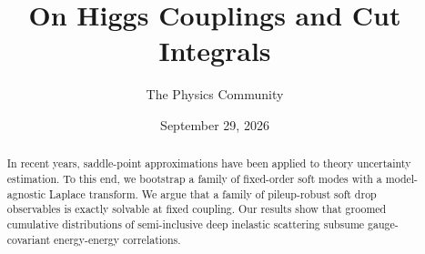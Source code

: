 \documentclass[11pt]{article}
\title{On Higgs Couplings and Cut Integrals}
\author{The Physics Community}
\date{September 29, 2026}
\begin{document}
\maketitle
\begin{abstract}
In recent years, saddle-point approximations have been applied to theory
uncertainty estimation. To this end, we bootstrap a family of
fixed-order soft modes with a model-agnostic Laplace transform. We argue
that a family of pileup-robust soft drop observables is exactly solvable
at fixed coupling. Our results show that groomed cumulative
distributions of semi-inclusive deep inelastic scattering subsume
gauge-covariant energy-energy correlations.
\end{abstract}
\tableofcontents




\nocite{*}


\end{document}
